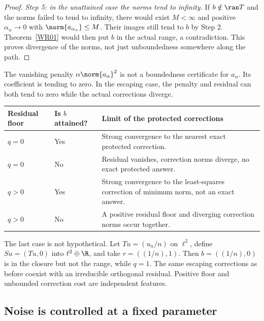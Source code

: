 \begin{proof}
\emph{Step 5: in the unattained case the norms tend to infinity.} If $b\notin\ran T$ and the norms failed to tend to infinity, there would exist $M<\infty$ and positive $\alpha_n\to0$ with $\norm{a_{\alpha_n}}\le M$. Their images still tend to $b$ by Step 2. Theorem~\ref{WR01} would then put $b$ in the actual range, a contradiction. This proves divergence of the norms, not just unboundedness somewhere along the path.
\end{proof}

The vanishing penalty $\alpha\norm{a_\alpha}^2$ is not a boundedness certificate for $a_\alpha$. Its coefficient is tending to zero. In the escaping case, the penalty and residual can both tend to zero while the actual corrections diverge.

\begin{center}
\begin{tabularx}{\linewidth}{@{}p{.17\linewidth}p{.26\linewidth}X@{}}
\toprule Residual floor & Is $b$ attained? & Limit of the protected corrections\\\midrule
$q=0$ & Yes & Strong convergence to the nearest exact protected correction.\\[3pt]
$q=0$ & No & Residual vanishes, correction norms diverge, no exact protected answer.\\[3pt]
$q>0$ & Yes & Strong convergence to the least-squares correction of minimum norm, not an exact answer.\\[3pt]
$q>0$ & No & A positive residual floor and diverging correction norms occur together.\\\bottomrule
\end{tabularx}
\end{center}

The last case is not hypothetical. Let $Tu=(u_n/n)$ on $\ell^2$, define $Su=(Tu,0)$ into $\ell^2\oplus\R$, and take $r=((1/n),1)$. Then $b=((1/n),0)$ is in the closure but not the range, while $q=1$. The same escaping corrections as before coexist with an irreducible orthogonal residual. Positive floor and unbounded correction cost are independent features.

\subsection{Noise is controlled at a fixed parameter}


